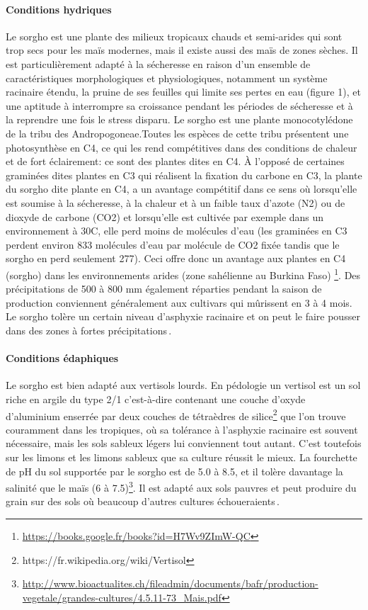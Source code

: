 \documentclass[a4paper,11pt]{article}
\begin{document}
\paragraph{Conditions hydriques} Le sorgho est une plante des milieux
tropicaux chauds et semi-arides qui sont trop secs pour les maïs
modernes, mais il existe aussi des maïs de zones sèches. Il est
particulièrement adapté à la sécheresse en raison d’un ensemble de
caractéristiques morphologiques et physiologiques, notamment un
système racinaire étendu, la pruine de ses feuilles qui limite ses
pertes en eau (figure 1), et une aptitude à interrompre sa croissance
pendant les périodes de sécheresse et à la reprendre une fois le
stress disparu. Le sorgho est une plante monocotylédone de la tribu
des Andropogoneae.Toutes les espèces de cette tribu présentent une
photosynthèse en C4, ce qui les rend compétitives dans des conditions
de chaleur et de fort éclairement: ce sont des plantes dites en C4. À
l’opposé de certaines graminées dites plantes en C3 qui réalisent la
fixation du carbone en C3, la plante du sorgho dite plante en C4, a un
avantage compétitif dans ce sens où lorsqu’elle est soumise à la
sécheresse, à la chaleur et à un faible taux d’azote (N2) ou de
dioxyde de carbone (CO2) et lorsqu’elle est cultivée par exemple dans
un environnement à 30\degree{}C, elle perd moins de molécules d’eau
(les graminées en C3 perdent environ 833 molécules d’eau par molécule
de CO2 fixée tandis que le sorgho en perd seulement 277). Ceci offre
donc un avantage aux plantes en C4 (sorgho) dans les environnements
arides (zone sahélienne au Burkina Faso)
\footnote{\url{https://books.google.fr/books?id=H7Wv9ZImW-QC}}. Des
 précipitations de 500 à 800 mm également réparties pendant la saison
 de production conviennent généralement aux cultivars qui mûrissent
 en 3 à 4 mois. Le sorgho tolère un certain niveau d’asphyxie
 racinaire et on peut le faire pousser dans des zones à fortes
 précipitations\,\cite{BARRO_KONDOMBO_2010}.

 
\paragraph{Conditions édaphiques}
Le sorgho est bien adapté aux vertisols lourds. En pédologie un
vertisol est un sol riche en argile du type 2/1 c’est-à-dire contenant
une couche d’oxyde d’aluminium enserrée par deux couches de tétraèdres
de silice\footnote{https://fr.wikipedia.org/wiki/Vertisol} que l’on
trouve couramment dans les tropiques, où sa tolérance à l’asphyxie
racinaire est souvent nécessaire, mais les sols sableux légers lui
conviennent tout autant. C’est toutefois sur les limons et les limons
sableux que sa culture réussit le mieux. La fourchette de pH du sol
supportée par le sorgho est de 5.0 à 8.5, et il tolère davantage la
salinité que le maïs (6 à 7.5)\footnote{\url{http://www.bioactualites.ch/fileadmin/documents/bafr/production-vegetale/grandes-cultures/4.5.11-73_Mais.pdf}}. Il
est adapté aux sols pauvres et peut produire du grain sur des sols où
beaucoup d’autres cultures échoueraients\,\cite{BARRO_KONDOMBO_2010}.
 
\end{document}
